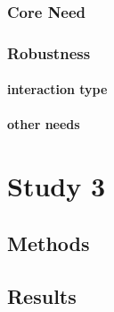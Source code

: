 \subsubsection{Core Need}

\subsubsection{Robustness}

\paragraph{interaction type}

\paragraph{other needs}

\section{Study 3}

\subsection{Methods}

\subsection{Results}
